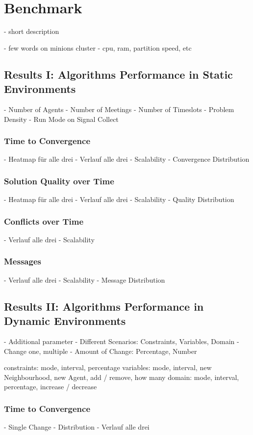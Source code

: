 \chapter{Benchmark}

- short description

- few words on minions cluster
- cpu, ram, partition speed, etc

\section{Results I: Algorithms Performance in Static Environments}

- Number of Agents
- Number of Meetings
- Number of Timeslots
- Problem Density
- Run Mode on Signal Collect

\subsection{Time to Convergence}
- Heatmap für alle drei
- Verlauf alle drei
- Scalability
- Convergence Distribution
\subsection{Solution Quality over Time}
- Heatmap für alle drei
- Verlauf alle drei
- Scalability
- Quality Distribution
\subsection{Conflicts over Time}
- Verlauf alle drei
- Scalability
\subsection{Messages}
-  Verlauf alle drei
- Scalability
- Message Distribution

\section{Results II: Algorithms Performance in Dynamic Environments}

- Additional parameter
- Different Scenarios: Constraints, Variables, Domain
- Change one, multiple
- Amount of Change: Percentage, Number

constraints: mode, interval, percentage
variables: mode, interval, new Neighbourhood, new Agent, add / remove, how many
domain: mode, interval, percentage, increase / decrease

\subsection{Time to Convergence}
- Single Change
- Distribution
- Verlauf alle drei
